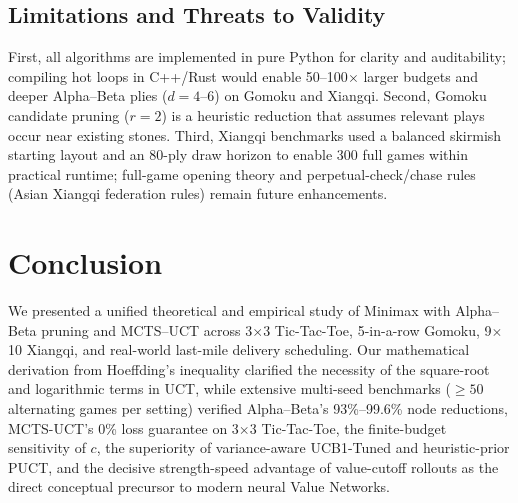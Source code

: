 \documentclass[conference]{IEEEtran}
\begin{document}
\subsection{Limitations and Threats to Validity}
First, all algorithms are implemented in pure Python for clarity and auditability; compiling hot loops in C++/Rust would enable 50--100$\times$ larger budgets and deeper Alpha--Beta plies ($d=4$--$6$) on Gomoku and Xiangqi. Second, Gomoku candidate pruning ($r=2$) is a heuristic reduction that assumes relevant plays occur near existing stones. Third, Xiangqi benchmarks used a balanced skirmish starting layout and an 80-ply draw horizon to enable 300 full games within practical runtime; full-game opening theory and perpetual-check/chase rules (Asian Xiangqi federation rules) remain future enhancements.

\section{Conclusion}
We presented a unified theoretical and empirical study of Minimax with Alpha--Beta pruning and MCTS--UCT across 3$\times$3 Tic-Tac-Toe, 5-in-a-row Gomoku, 9$\times$10 Xiangqi, and real-world last-mile delivery scheduling. Our mathematical derivation from Hoeffding's inequality clarified the necessity of the square-root and logarithmic terms in UCT, while extensive multi-seed benchmarks ($\ge 50$ alternating games per setting) verified Alpha--Beta's 93\%--99.6\% node reductions, MCTS-UCT's 0\% loss guarantee on 3$\times$3 Tic-Tac-Toe, the finite-budget sensitivity of $c$, the superiority of variance-aware UCB1-Tuned and heuristic-prior PUCT, and the decisive strength-speed advantage of value-cutoff rollouts as the direct conceptual precursor to modern neural Value Networks.
\end{document}
